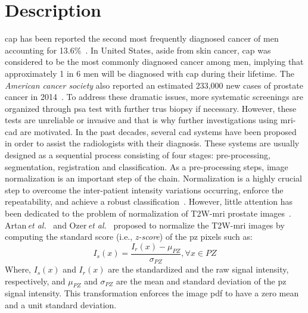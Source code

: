 \graphicspath{ {./content/intro/figures/} }

\section{Description}
\label{sec:descr}  %

\Ac{cap} has been reported the second most frequently diagnosed cancer of men accounting for 13.6\%~\cite{ferlay2010estimates}. 
In United States, aside from skin cancer, \ac{cap} was considered to be the most commonly diagnosed cancer among men, implying that approximately 1 in 6 men will be diagnosed with \ac{cap} during their lifetime.
The \textit{American cancer society} also reported an estimated 233,000 new cases of prostate cancer in 2014~\cite{CancerFactsFigures2014}. 
To address these dramatic issues, more systematic screenings are organized through \ac{psa} test with further \ac{trus} biopsy if necessary.
However, these tests are unreliable or invasive and that is why further investigations using \ac{mri}-\ac{cad} are motivated. 
In the past decades, several \ac{cad} systems have been proposed in order to assist the radiologists with their diagnosis. 
These systems are usually designed as a sequential process consisting of four stages: pre-processing, segmentation, registration and classification.
As a pre-processing steps, image normalization is an important step of the chain. 
Normalization is a highly crucial step to overcome the inter-patient intensity variations occurring, enforce the repeatability, and achieve a robust classification~\cite{Lemaitre2015}.
However, little attention has been dedicated to the problem of normalization of T2W-\ac{mri} prostate images~\cite{Lemaitre2015}.
Artan\,\textit{et al.}~\cite{artan2010prostate,artan2009prostate} and Ozer\,\textit{et al.}~\cite{ozer2009prostate,ozer2010supervised} proposed to normalize the T2W-\ac{mri} images by computing the standard score (i.e., \textit{z-score}) of the \ac{pz} pixels such as: 
\begin{equation}
  I_{s}(x) = \frac{I_{r}(x) - \mu_{PZ}}{\sigma_{PZ}}, \forall x\in PZ
\end{equation}
\noindent Where, $I_{s}(x)$ and $I_{r}(x)$ are the standardized and the raw signal intensity, respectively, and $\mu_{PZ}$ and $\sigma_{PZ}$ are the mean and standard deviation of the \ac{pz} signal intensity. 
This transformation enforces the image \ac{pdf} to have a zero mean and a unit standard deviation.
